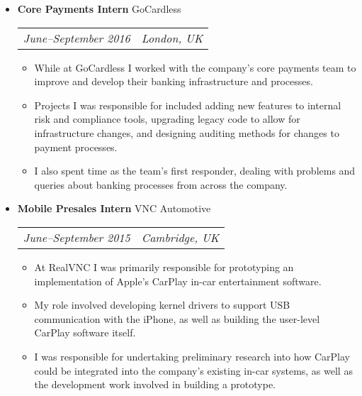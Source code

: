 \documentclass[letterpaper]{article}
\begin{document}
\begin{itemize}

    \item \textbf{Core Payments Intern} GoCardless \\
        \begin{tabular}{c|c}
            \emph{June--September 2016} & \emph{London, UK}
        \end{tabular}
        \begin{itemize}
          \item While at GoCardless I worked with the company's core payments
            team to improve and develop their banking infrastructure and
            processes.
          \item Projects I was responsible for included adding new features to
            internal risk and compliance tools, upgrading legacy code to allow
            for infrastructure changes, and designing auditing methods for
            changes to payment processes.
          \item I also spent time as the team's first responder, dealing with
            problems and queries about banking processes from across the
            company.
        \end{itemize}

    \item \textbf{Mobile Presales Intern} VNC Automotive \\
        \begin{tabular}{c|c}
            \emph{June--September 2015} & \emph{Cambridge, UK}
        \end{tabular}
        \begin{itemize}
            \item At RealVNC I was primarily responsible for prototyping an
              implementation of Apple's CarPlay in-car entertainment software.

            \item My role involved developing kernel drivers to support USB
              communication with the iPhone, as well as building the user-level
              CarPlay software itself.

            \item I was responsible for undertaking preliminary research into
              how CarPlay could be integrated into the company's existing in-car
              systems, as well as the development work involved in building a
              prototype.
        \end{itemize}


\end{itemize}
\end{document}
